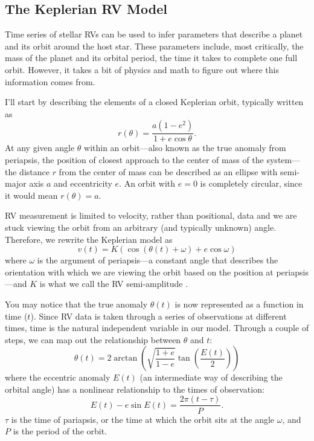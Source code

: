 \subsection{The Keplerian RV Model}

Time series of stellar RVs can be used to infer parameters that describe a planet and its orbit around the host star. These parameters include, most critically, the mass of the planet and its orbital period, the time it takes to complete one full orbit. However, it takes a bit of physics and math to figure out where this information comes from.

I'll start by describing the elements of a closed Keplerian orbit, typically written as
\begin{equation}
    r(\theta) = \frac{a (1-e^2)}{1 + e \cos{\theta}}.
    \label{eq:kepler}
\end{equation}
At any given angle $\theta$ within an orbit---also known as the true anomaly from periapsis, the position of closest approach to the center of mass of the system---the distance $r$ from the center of mass can be described as an ellipse with semi-major axis $a$ and eccentricity $e$. An orbit with $e=0$ is completely circular, since it would mean $r(\theta)=a$.

RV measurement is limited to velocity, rather than positional, data and we are stuck viewing the orbit from an arbitrary (and typically unknown) angle. Therefore, we rewrite the Keplerian model as
\begin{equation}
    v(t) = K (\cos{(\theta(t)+\omega)} + e \cos{\omega})
    \label{eq:kepler-rv}
\end{equation}
where $\omega$ is the argument of periapsis---a constant angle that describes the orientation with which we are viewing the orbit based on the position at periapsis---and $K$ is what we call the RV semi-amplitude \citep{lovis_radial_2011}.

You may notice that the true anomaly $\theta(t)$ is now represented as a function in time ($t$). Since RV data is taken through a series of observations at different times, time is the natural independent variable in our model. Through a couple of steps, we can map out the relationship between $\theta$ and $t$:
\begin{equation}
    \theta(t) = 2 \arctan{\left(\sqrt{\frac{1+e}{1-e}}\tan{\left(\frac{E(t)}{2}\right)}\right)}
    \label{eq:mean-anomaly}
\end{equation}
where the eccentric anomaly $E(t)$ (an intermediate way of describing the orbital angle) has a nonlinear relationship to the times of observation:
\begin{equation}
    E(t) - e \sin{E(t)} = \frac{2\pi (t - \tau)}{P}.
    \label{eq:eccentric-anomaly}
\end{equation}
$\tau$ is the time of pariapsis, or the time at which the orbit sits at the angle $\omega$, and $P$ is the period of the orbit.

